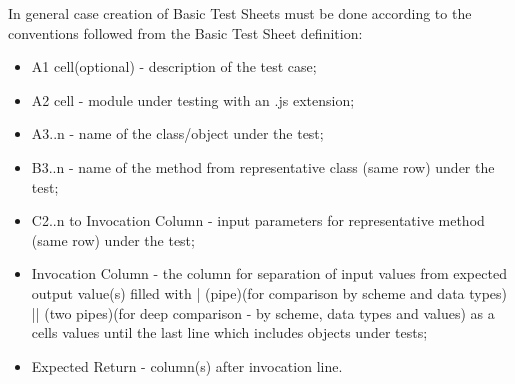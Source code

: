 	

\label{sec:conventions}

In general case creation of Basic Test Sheets must be done according to the conventions followed from the Basic Test Sheet definition:
\begin{itemize}
	\item A1 cell(optional) - description of the test case;
	\item A2 cell - module under testing with an .js extension;
	\item A3..n - name of the class/object under the test;
	\item B3..n - name of the method from representative class (same row) under the test;
	\item C2..n to Invocation Column - input parameters for representative method (same row) under the test;
	\item Invocation Column - the column for separation of input values from expected output value(s) filled with | (pipe)(for comparison by scheme and data types) || (two pipes)(for deep comparison - by scheme, data types and values) as a cells values until the last line which includes objects under tests;
	\item Expected Return - column(s) after invocation line.\\
\end{itemize}

